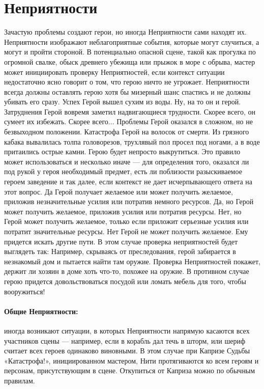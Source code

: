 \section{Неприятности}

Зачастую проблемы создают герои, но иногда Неприятности сами находят их. Неприятности изображают неблагоприятные события, которые могут случиться, а могут и пройти стороной. В потенциально опасной сцене, такой как прогулка по огромной свалке, обыск древнего убежища или прыжок в море с обрыва, мастер может инициировать проверку Неприятностей, если контекст ситуации недостаточно ясно говорит о том, что герою ничто не угрожает.
\newline
Неприятности всегда должны оставлять герою хотя бы мизерный шанс спастись и не должны убивать его сразу.
\trouble
{Успех}%
{Герой вышел сухим из воды. Ну, на то он и герой.}%
{Затруднения}%
{Герой вовремя заметил надвигающиеся трудности. Скорее всего, он сумеет их избежать. Скорее всего...}%
{Проблемы}%
{Герой оказался в сложном, но не безвыходном положении.}%
{Катастрофа}%
{Герой на волосок от смерти. Из грязного кабака вывалилась толпа головорезов, трухлявый пол просел под ногами, а в воде притаились острые камни. Герою будет непросто выкрутиться.}%
Это правило может использоваться и несколько иначе — для определения того, оказался ли под рукой у героя необходимый предмет, есть ли поблизости разыскиваемое героем заведение и так далее, если контекст не дает исчерпывающего ответа на этот вопрос.
\trouble
{Да}%
{Герой получает желаемое или может получить желаемое, приложив незначительные усилия или потратив немного ресурсов.}%
{Да, но}%
{Герой может получить желаемое, приложив усилия или потратив ресурсы.}%
{Нет, но}%
{Герой может получить желаемое, только если приложит серьезные усилия или потратит значительные ресурсы.}%
{Нет}%
{Герой не может получить желаемое. Ему придется искать другие пути.}%
В этом случае проверка неприятностей будет выглядеть так: Например, скрываясь от преследования, герой забирается в незнакомый дом и пытается найти там оружие. Проверка Неприятностей покажет, держит ли хозяин в доме хоть что-то, похожее на оружие. В противном случае герою придется довольствоваться посудой или ломать мебель для того, чтобы вооружиться!
\paragraph{Общие Неприятности:} иногда возникают ситуации, в которых Неприятности напрямую касаются всех участников сцены — например, если в корабль дал течь в шторм, или шериф считает всех героев одинаково виновными. В этом случае при Капризе Судьбы «Катастрофа!», инициированном мастером, Нити протягиваются ко всем героям и персонам, присутствующим в сцене. Откупиться от Каприза можно по обычным правилам.
